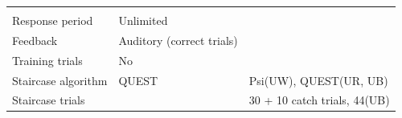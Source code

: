 \documentclass[]{article}
\begin{document}
\begin{longtable}[]{@{}lll@{}}
\begin{minipage}[t]{0.11\columnwidth}
\end{minipage}\tabularnewline
\begin{minipage}[t]{0.15\columnwidth}\raggedright\strut
Response period\strut
\end{minipage} & \begin{minipage}[t]{0.13\columnwidth}\raggedright\strut
Unlimited\strut
\end{minipage} & \begin{minipage}[t]{0.11\columnwidth}\raggedright\strut
\strut
\end{minipage}\tabularnewline
\begin{minipage}[t]{0.15\columnwidth}\raggedright\strut
Feedback\strut
\end{minipage} & \begin{minipage}[t]{0.13\columnwidth}\raggedright\strut
Auditory (correct trials)\strut
\end{minipage} & \begin{minipage}[t]{0.11\columnwidth}\raggedright\strut
\strut
\end{minipage}\tabularnewline
\begin{minipage}[t]{0.15\columnwidth}\raggedright\strut
Training trials\strut
\end{minipage} & \begin{minipage}[t]{0.13\columnwidth}\raggedright\strut
No\strut
\end{minipage} & \begin{minipage}[t]{0.11\columnwidth}\raggedright\strut
\strut
\end{minipage}\tabularnewline
\begin{minipage}[t]{0.15\columnwidth}\raggedright\strut
Staircase algorithm\strut
\end{minipage} & \begin{minipage}[t]{0.13\columnwidth}\raggedright\strut
QUEST\strut
\end{minipage} & \begin{minipage}[t]{0.11\columnwidth}\raggedright\strut
Psi(UW), QUEST(UR, UB)\strut
\end{minipage}\tabularnewline
\begin{minipage}[t]{0.15\columnwidth}\raggedright\strut
Staircase trials\strut
\end{minipage} & \begin{minipage}[t]{0.13\columnwidth}\raggedright\strut
\strut
\end{minipage} & \begin{minipage}[t]{0.11\columnwidth}\raggedright\strut
30 + 10 catch trials, 44(UB)\strut

\end{minipage}
\end{longtable}
\end{document}

